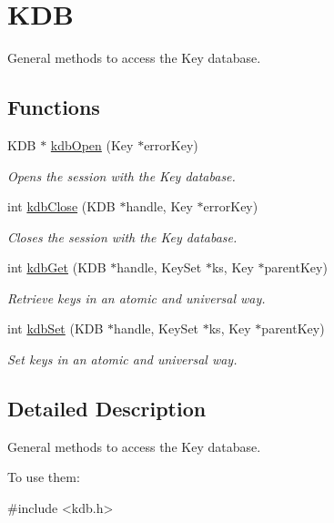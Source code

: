 \hypertarget{group__kdb}{\section{K\+D\+B}
\label{group__kdb}
}


General methods to access the Key database.  


\subsection*{Functions}
\begin{DoxyCompactItemize}
\item 
K\+D\+B $\ast$ \hyperlink{group__kdb_ga6808defe5870f328dd17910aacbdc6ca}{kdb\+Open} (Key $\ast$error\+Key)
\begin{DoxyCompactList}\small\item\em Opens the session with the Key database. \end{DoxyCompactList}\item 
int \hyperlink{group__kdb_gadb54dc9fda17ee07deb9444df745c96f}{kdb\+Close} (K\+D\+B $\ast$handle, Key $\ast$error\+Key)
\begin{DoxyCompactList}\small\item\em Closes the session with the Key database. \end{DoxyCompactList}\item 
int \hyperlink{group__kdb_ga28e385fd9cb7ccfe0b2f1ed2f62453a1}{kdb\+Get} (K\+D\+B $\ast$handle, Key\+Set $\ast$ks, Key $\ast$parent\+Key)
\begin{DoxyCompactList}\small\item\em Retrieve keys in an atomic and universal way. \end{DoxyCompactList}\item 
int \hyperlink{group__kdb_ga11436b058408f83d303ca5e996832bcf}{kdb\+Set} (K\+D\+B $\ast$handle, Key\+Set $\ast$ks, Key $\ast$parent\+Key)
\begin{DoxyCompactList}\small\item\em Set keys in an atomic and universal way. \end{DoxyCompactList}\end{DoxyCompactItemize}


\subsection{Detailed Description}
General methods to access the Key database. 

To use them\+: 
\begin{DoxyCode}
\textcolor{preprocessor}{#include <kdb.h>}
\end{DoxyCode}


